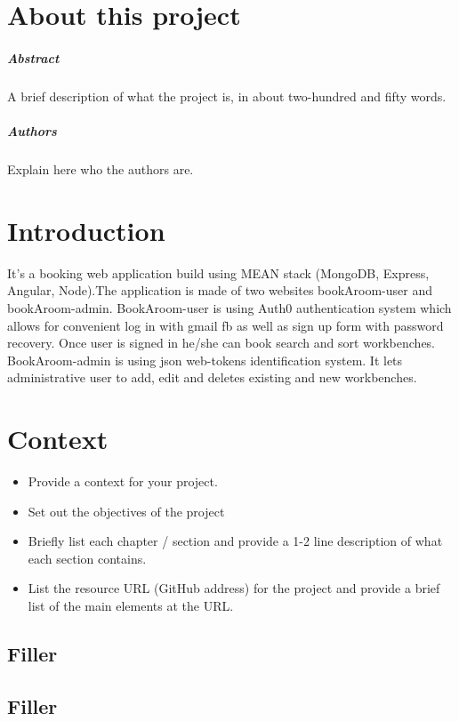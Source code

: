 \chapter*{About this project}
\paragraph{Abstract}
A brief description of what the project is, in about two-hundred and fifty words.

\paragraph{Authors}
Explain here who the authors are.



\chapter{Introduction}
It’s a booking web application build using MEAN stack (MongoDB, Express, Angular, Node).The application is made of two websites bookAroom-user and bookAroom-admin.
BookAroom-user is using Auth0 authentication system which allows for convenient log in with gmail fb as well as sign up form with password recovery. Once user is signed in he/she can book search and sort workbenches.
BookAroom-admin is using json web-tokens identification system. It lets administrative user to add, edit and deletes existing and new workbenches.

\chapter{Context}
\begin{itemize}
\item Provide a context for your project.
\item Set out the objectives of the project
\item Briefly list each chapter / section and provide a 1-2 line description of what each section contains.
\item List the resource URL (GitHub address) for the project and provide a brief list of the main elements at the URL.
\end{itemize}

\section{Filler}


\section{Filler}


